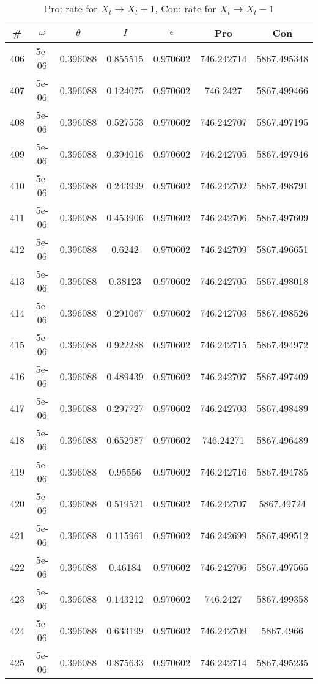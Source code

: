 \newpage
\begin{table}
\caption{Pro: rate for $X_t \rightarrow X_t + 1$, Con: rate for $X_t \rightarrow X_t - 1$}
\begin{tabular*}{\linewidth}{c|c|c|c|c|c|c}
\# & $\omega$ & $\theta$ & $I$ & $\epsilon$ & Pro & Con \\
\hline
406 & 5e-06 & 0.396088 & 0.855515 & 0.970602 & 746.242714 & 5867.495348\\
407 & 5e-06 & 0.396088 & 0.124075 & 0.970602 & 746.2427 & 5867.499466\\
408 & 5e-06 & 0.396088 & 0.527553 & 0.970602 & 746.242707 & 5867.497195\\
409 & 5e-06 & 0.396088 & 0.394016 & 0.970602 & 746.242705 & 5867.497946\\
410 & 5e-06 & 0.396088 & 0.243999 & 0.970602 & 746.242702 & 5867.498791\\
411 & 5e-06 & 0.396088 & 0.453906 & 0.970602 & 746.242706 & 5867.497609\\
412 & 5e-06 & 0.396088 & 0.6242 & 0.970602 & 746.242709 & 5867.496651\\
413 & 5e-06 & 0.396088 & 0.38123 & 0.970602 & 746.242705 & 5867.498018\\
414 & 5e-06 & 0.396088 & 0.291067 & 0.970602 & 746.242703 & 5867.498526\\
415 & 5e-06 & 0.396088 & 0.922288 & 0.970602 & 746.242715 & 5867.494972\\
416 & 5e-06 & 0.396088 & 0.489439 & 0.970602 & 746.242707 & 5867.497409\\
417 & 5e-06 & 0.396088 & 0.297727 & 0.970602 & 746.242703 & 5867.498489\\
418 & 5e-06 & 0.396088 & 0.652987 & 0.970602 & 746.24271 & 5867.496489\\
419 & 5e-06 & 0.396088 & 0.95556 & 0.970602 & 746.242716 & 5867.494785\\
420 & 5e-06 & 0.396088 & 0.519521 & 0.970602 & 746.242707 & 5867.49724\\
421 & 5e-06 & 0.396088 & 0.115961 & 0.970602 & 746.242699 & 5867.499512\\
422 & 5e-06 & 0.396088 & 0.46184 & 0.970602 & 746.242706 & 5867.497565\\
423 & 5e-06 & 0.396088 & 0.143212 & 0.970602 & 746.2427 & 5867.499358\\
424 & 5e-06 & 0.396088 & 0.633199 & 0.970602 & 746.242709 & 5867.4966\\
425 & 5e-06 & 0.396088 & 0.875633 & 0.970602 & 746.242714 & 5867.495235\\

\end{tabular*}
\end{table}
